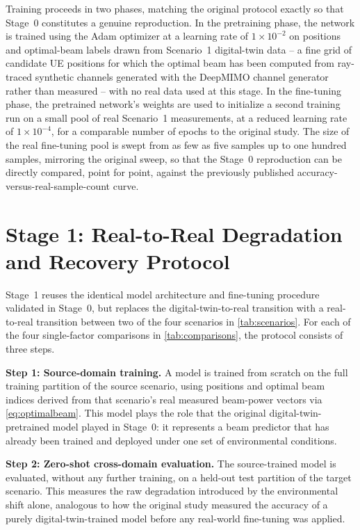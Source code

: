 \documentclass{iutbscthesis}
\begin{document}
Training proceeds in two phases, matching the original protocol exactly so that Stage~0 constitutes a genuine reproduction. In the pretraining phase, the network is trained using the Adam optimizer at a learning rate of $1\times10^{-2}$ on positions and optimal-beam labels drawn from Scenario~1 digital-twin data -- a fine grid of candidate UE positions for which the optimal beam has been computed from ray-traced synthetic channels generated with the DeepMIMO channel generator \cite{alkhateeb2019deepmimo} rather than measured -- with no real data used at this stage. In the fine-tuning phase, the pretrained network's weights are used to initialize a second training run on a small pool of real Scenario~1 measurements, at a reduced learning rate of $1\times10^{-4}$, for a comparable number of epochs to the original study. The size of the real fine-tuning pool is swept from as few as five samples up to one hundred samples, mirroring the original sweep, so that the Stage~0 reproduction can be directly compared, point for point, against the previously published accuracy-versus-real-sample-count curve.

\section{Stage 1: Real-to-Real Degradation and Recovery Protocol}
\label{sec:stage1}

Stage~1 reuses the identical model architecture and fine-tuning procedure validated in Stage~0, but replaces the digital-twin-to-real transition with a real-to-real transition between two of the four scenarios in \autoref{tab:scenarios}. For each of the four single-factor comparisons in \autoref{tab:comparisons}, the protocol consists of three steps.

\textbf{Step 1: Source-domain training.} A model is trained from scratch on the full training partition of the source scenario, using positions and optimal beam indices derived from that scenario's real measured beam-power vectors via \autoref{eq:optimalbeam}. This model plays the role that the original digital-twin-pretrained model played in Stage~0: it represents a beam predictor that has already been trained and deployed under one set of environmental conditions.

\textbf{Step 2: Zero-shot cross-domain evaluation.} The source-trained model is evaluated, without any further training, on a held-out test partition of the target scenario. This measures the raw degradation introduced by the environmental shift alone, analogous to how the original study measured the accuracy of a purely digital-twin-trained model before any real-world fine-tuning was applied.
\end{document}
